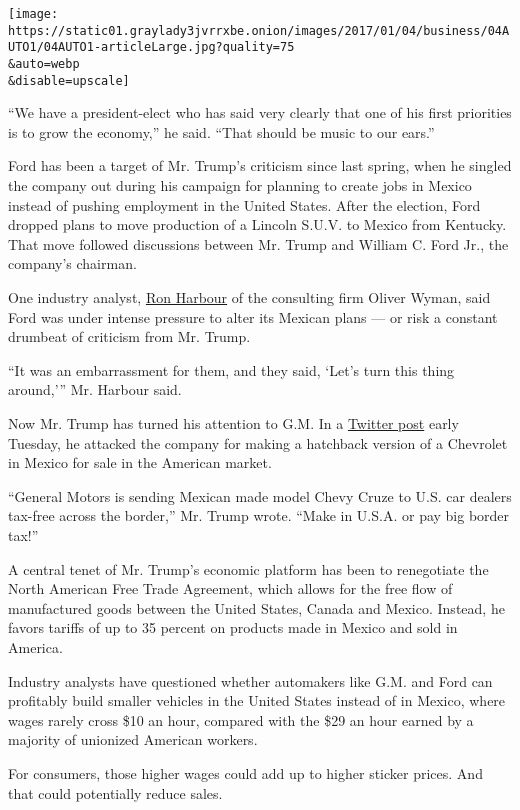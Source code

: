 \texttt{[image: https://static01.graylady3jvrrxbe.onion/images/2017/01/04/business/04AUTO1/04AUTO1-articleLarge.jpg?quality=75\\\&auto=webp\\\&disable=upscale]}

``We have a president-elect who has said very clearly that one of his
first priorities is to grow the economy,'' he said. ``That should be
music to our ears.''

Ford has been a target of Mr. Trump's criticism since last spring, when
he singled the company out during his campaign for planning to create
jobs in Mexico instead of pushing employment in the United States. After
the election, Ford dropped plans to move production of a Lincoln S.U.V.
to Mexico from Kentucky. That move followed discussions between Mr.
Trump and William C. Ford Jr., the company's chairman.

One industry analyst,
\href{http://www.oliverwyman.com/our-culture/our-people/ron-harbour.html}{Ron
Harbour} of the consulting firm Oliver Wyman, said Ford was under
intense pressure to alter its Mexican plans --- or risk a constant
drumbeat of criticism from Mr. Trump.

``It was an embarrassment for them, and they said, `Let's turn this
thing around,''' Mr. Harbour said.

Now Mr. Trump has turned his attention to G.M. In a
\href{https://twitter.com/realDonaldTrump/status/816260343391514624}{Twitter
post} early Tuesday, he attacked the company for making a hatchback
version of a Chevrolet in Mexico for sale in the American market.

``General Motors is sending Mexican made model Chevy Cruze to U.S. car
dealers tax-free across the border,'' Mr. Trump wrote. ``Make in U.S.A.
or pay big border tax!''

A central tenet of Mr. Trump's economic platform has been to renegotiate
the North American Free Trade Agreement, which allows for the free flow
of manufactured goods between the United States, Canada and Mexico.
Instead, he favors tariffs of up to 35 percent on products made in
Mexico and sold in America.

Industry analysts have questioned whether automakers like G.M. and Ford
can profitably build smaller vehicles in the United States instead of in
Mexico, where wages rarely cross \$10 an hour, compared with the \$29 an
hour earned by a majority of unionized American workers.

For consumers, those higher wages could add up to higher sticker prices.
And that could potentially reduce sales.

